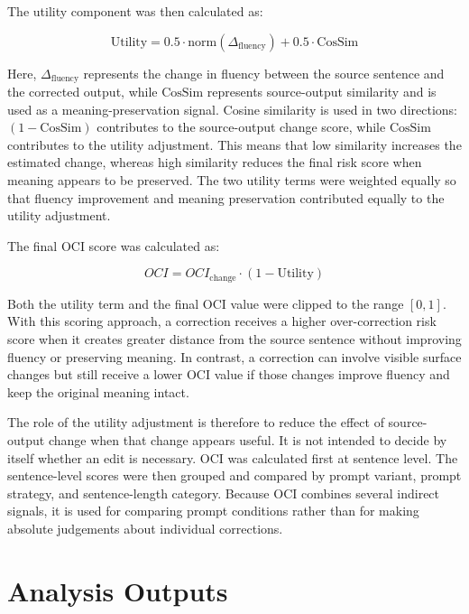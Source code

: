 The utility component was then calculated as:

\begin{equation}
\text{Utility} = 0.5 \cdot \text{norm}(\Delta_{\text{fluency}}) + 0.5 \cdot \text{CosSim}
\end{equation}

Here, $\Delta_{\text{fluency}}$ represents the change in fluency between the source sentence and the corrected output, while $\text{CosSim}$ represents source-output similarity and is used as a meaning-preservation signal. Cosine similarity is used in two directions: $(1-\text{CosSim})$ contributes to the source-output change score, while $\text{CosSim}$ contributes to the utility adjustment. This means that low similarity increases the estimated change, whereas high similarity reduces the final risk score when meaning appears to be preserved. The two utility terms were weighted equally so that fluency improvement and meaning preservation contributed equally to the utility adjustment.

The final OCI score was calculated as:

\begin{equation}
OCI = OCI_{\text{change}} \cdot (1 - \text{Utility})
\end{equation}

Both the utility term and the final OCI value were clipped to the range $[0,1]$. With this scoring approach, a correction receives a higher over-correction risk score when it creates greater distance from the source sentence without improving fluency or preserving meaning. In contrast, a correction can involve visible surface changes but still receive a lower OCI value if those changes improve fluency and keep the original meaning intact.

The role of the utility adjustment is therefore to reduce the effect of source-output change when that change appears useful. It is not intended to decide by itself whether an edit is necessary. OCI was calculated first at sentence level. The sentence-level scores were then grouped and compared by prompt variant, prompt strategy, and sentence-length category. Because OCI combines several indirect signals, it is used for comparing prompt conditions rather than for making absolute judgements about individual corrections.

\section{Analysis Outputs}

